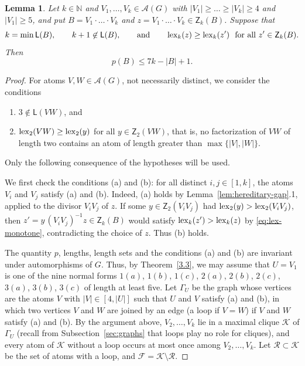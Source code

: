 \documentclass[a4paper, 10pt]{amsart}
\theoremstyle{plain}
\newtheorem{lemma}[theorem]{\bf Lemma}
\theoremstyle{definition}
\theoremstyle{definition}
\newcommand{\N}{\mathbb N}
\numberwithin{equation}{section}
\begin{document}
\begin{lemma}\label{lem:comp:length-two-atoms}
Let $k \in \N$ and $V_1,\ldots, V_k\in \mathcal A(G)$ with
$|V_1|\ge \ldots \ge |V_k|\ge 4$ and $|V_1|\ge 5$, and put
$B = V_1\cdot\ldots\cdot V_k$ and $z = V_1\cdot\ldots\cdot V_k \in \mathsf Z_k (B)$.
Suppose that
\[
 k=\min \mathsf L(B), \qquad k+1\not\in \mathsf L(B), \qquad \text{and} \qquad
 \operatorname{lex}_k(z)\ge \operatorname{lex}_k(z') \ \text{ for all } z'\in \mathsf Z_k(B) .
\]
Then
\[
 p(B) \le 7k - |B| + 1 .
\]
\end{lemma}

\begin{proof}
For atoms $V, W \in \mathcal A (G)$, not necessarily distinct, we consider
the conditions
\begin{enumerate}
\item[(a)] $3 \notin \mathsf L (VW)$, and
\item[(b)] $\operatorname{lex}_2 (VW) \ge \operatorname{lex}_2 (y)$ for all $y \in \mathsf Z_2 (VW)$,
      that is, no factorization of $VW$ of length two contains an atom of length
      greater than $\max \{|V|,|W|\}$.
\end{enumerate}
Only the following consequence of the hypotheses will be used.

\smallskip
\noindent
We first check the conditions (a) and (b): for all distinct $i, j \in [1,k]$,
the atoms $V_i$ and $V_j$ satisfy (a) and (b).  Indeed, (a) holds by 
Lemma~\ref{lem:hereditary-gap}.1, applied to the divisor $V_iV_j$ of $z$.  If some
$y \in \mathsf Z_2 (V_iV_j)$ had $\operatorname{lex}_2 (y) > \operatorname{lex}_2 (V_iV_j)$, then
$z' = y\,(V_iV_j)^{-1}z \in \mathsf Z_k (B)$ would satisfy
$\operatorname{lex}_k (z') > \operatorname{lex}_k (z)$ by \eqref{eq:lex-monotone}, contradicting the
choice of $z$.  Thus (b) holds.

The quantity $p$, lengths, length sets and the
conditions (a) and (b) are invariant under automorphisms of $G$.  Thus, by
Theorem~\ref{3.3}, we may assume that $U = V_1$ is one of the nine normal
forms $1(a)$, $1(b)$, $1(c)$, $2(a)$, $2(b)$, $2(c)$, $3(a)$, $3(b)$, $3(c)$
of length at least five.  Let $\Gamma_U$ be the graph whose vertices are the
atoms $V$ with $|V| \in [4,|U|]$ such that $U$ and $V$ satisfy (a) and (b), in
which two vertices $V$ and $W$ are joined by an edge (a loop if $V = W$) if
$V$ and $W$ satisfy (a) and (b).  By the argument above, $V_2, \ldots, V_k$ lie in a
maximal clique $\mathcal K$ of $\Gamma_U$ (recall from
Subsection~\ref{sec:graphs} that loops play no role for cliques), and every
atom of $\mathcal K$ without a loop occurs at most once among
$V_2, \ldots, V_k$.  Let $\mathcal R \subset \mathcal K$ be the set of atoms
with a loop, and $\mathcal F = \mathcal K \setminus \mathcal R$.


\end{proof}
\end{document}
